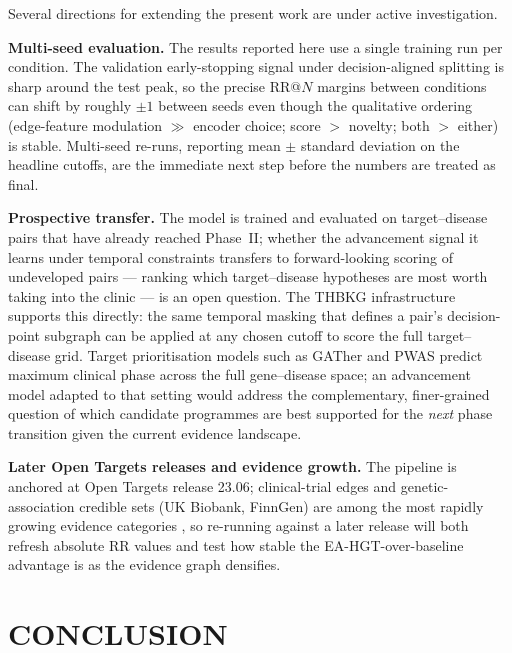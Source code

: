 \documentclass[a4,center]{NAR}
\newcommand{\eahgt}{\textsc{EA-HGT}}
\begin{document}
{Several directions for extending the present work are under active
investigation.

\textbf{Multi-seed evaluation.} The results reported here use a single
training run per condition. The validation early-stopping signal under
decision-aligned splitting is sharp around the test peak, so the precise
RR@$N$ margins between conditions can shift by roughly $\pm 1$ between
seeds even though the qualitative ordering (edge-feature modulation
$\gg$ encoder choice; score $>$ novelty; both $>$ either) is stable.
Multi-seed re-runs, reporting mean $\pm$ standard deviation on the
headline cutoffs, are the immediate next step before the numbers are
treated as final.

\textbf{Prospective transfer.} The model is trained and evaluated on
target--disease pairs that have already reached Phase~II; whether the
advancement signal it learns under temporal constraints transfers to
forward-looking scoring of undeveloped pairs --- ranking which
target--disease hypotheses are most worth taking into the clinic --- is
an open question. The THBKG infrastructure supports this directly: the
same temporal masking that defines a pair's decision-point subgraph can
be applied at any chosen cutoff to score the full target--disease grid.
Target prioritisation models such as GATher \citep{Narganes-Carlon2024GATher:Links}
and PWAS \citep{Narganes-Carlon2023ATargets} predict maximum clinical phase
across the full gene--disease space; an advancement model adapted to that
setting would address the complementary, finer-grained question of which
candidate programmes are best supported for the \emph{next} phase
transition given the current evidence landscape.

\textbf{Later Open Targets releases and evidence growth.} The pipeline
is anchored at Open Targets release 23.06; clinical-trial edges and
genetic-association credible sets (UK Biobank, FinnGen) are among the
most rapidly growing evidence categories \citep{Falaguera2025TemporalDiscovery}, so
re-running against a later release will both refresh absolute RR values
and test how stable the \eahgt{}-over-baseline advantage is as the
evidence graph densifies.


\section{CONCLUSION}

}
\end{document}
